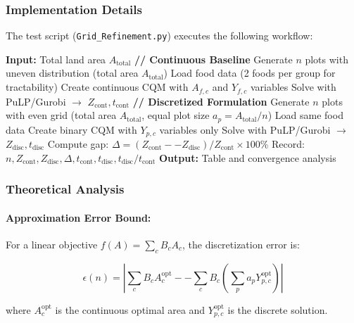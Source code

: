 \documentclass{oqireport}
\begin{document}
\subsubsection{Implementation Details}

The test script (\texttt{Grid\_Refinement.py}) executes the following workflow:

\begin{algorithm}[H]
\caption{Grid Refinement Convergence Study}
\begin{algorithmic}[1]
\State \textbf{Input:} Total land area $A_{\text{total}}$
    \State \textbf{// Continuous Baseline}
    \State Generate $n$ plots with uneven distribution (total area $A_{\text{total}}$)
    \State Load food data (2 foods per group for tractability)
    \State Create continuous CQM with $A_{f,c}$ and $Y_{f,c}$ variables
    \State Solve with PuLP/Gurobi $\to$ $Z_{\text{cont}}, t_{\text{cont}}$
    \State
    \State \textbf{// Discretized Formulation}
    \State Generate $n$ plots with even grid (total area $A_{\text{total}}$, equal plot size $a_p = A_{\text{total}}/n$)
    \State Load same food data
    \State Create binary CQM with $Y_{p,c}$ variables only
    \State Solve with PuLP/Gurobi $\to$ $Z_{\text{disc}}, t_{\text{disc}}$
    \State
    \State Compute gap: $\Delta = (Z_{\text{cont}} -- Z_{\text{disc}})/Z_{\text{cont}} \times 100\%$
    \State Record: $n, Z_{\text{cont}}, Z_{\text{disc}}, \Delta, t_{\text{cont}}, t_{\text{disc}}, t_{\text{disc}}/t_{\text{cont}}$
\EndFor
\State \textbf{Output:} Table and convergence analysis
\end{algorithmic}
\end{algorithm}

\subsubsection{Theoretical Analysis}

\paragraph{Approximation Error Bound:}

For a linear objective $f(A) = \sum_c B_c A_c$, the discretization error is:

$$\epsilon(n) = \left| \sum_c B_c A_c^{\text{opt}} -- \sum_c B_c \left(\sum_p a_p Y_{p,c}^{\text{opt}}\right) \right|$$

where $A_c^{\text{opt}}$ is the continuous optimal area and $Y_{p,c}^{\text{opt}}$ is the discrete solution.
\end{document}
